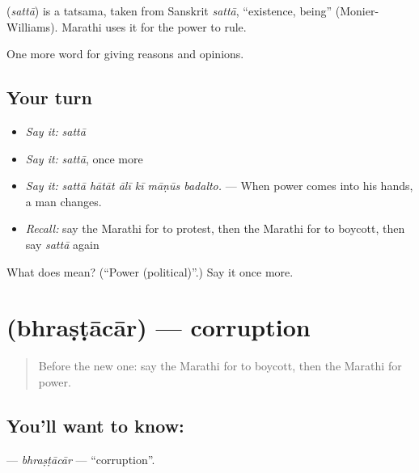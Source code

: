 \begin{cousinweb}
\textbf{} (\emph{sattā}) is a tatsama, taken from Sanskrit \emph{sattā}, \textquotedblleft{}existence, being\textquotedblright{} (Monier-Williams). Marathi uses it for the power to rule.
\end{cousinweb}

\begin{grammarlens}[title={What you've built}]
One more word for giving reasons and opinions.
\end{grammarlens}

\subsection*{Your turn}
\begin{itemize}
\raggedright
  \item \emph{Say it:} \emph{sattā}
  \item \emph{Say it:} \emph{sattā}, once more
  \item \emph{Say it:} \emph{sattā hātāt ālī kī māṇūs badalto.} — When power comes into his hands, a man changes.
  \item \emph{Recall:} say the Marathi for to protest, then the Marathi for to boycott, then say \emph{sattā} again
\end{itemize}

\begin{tcolorbox}[breakable,colback=teal!4,colframe=teal!35!black,title={Before you move on}]
What does  mean? (\textquotedblleft{}Power (political)\textquotedblright{}.) Say it once more.
\end{tcolorbox}
\section[\texorpdfstring{\mr{भ्रष्टाचार} (bhraṣṭācār)}{भ्रष्टाचार (bhraṣṭācār)}]{ (bhraṣṭācār) — corruption}

\label{lesson:MR-C363-bhrastacar}



\begin{quote}
Before the new one: say the Marathi for to boycott, then the Marathi for power.
\end{quote}

\subsection*{You'll want to know: }
\textbf{} — \emph{bhraṣṭācār} — \textquotedblleft{}corruption\textquotedblright{}.

